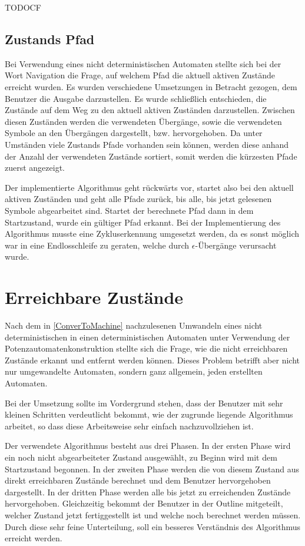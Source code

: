 TODOCF


\subsection{Zustands Pfad}

Bei Verwendung eines nicht deterministischen Automaten stellte sich bei der
Wort Navigation die Frage, auf welchem Pfad die aktuell aktiven Zustände
erreicht wurden. Es wurden verschiedene Umsetzungen in Betracht gezogen, dem
Benutzer die Ausgabe darzustellen. Es wurde schließlich entschieden, die
Zustände auf dem Weg zu den aktuell aktiven Zuständen darzustellen. Zwischen
diesen Zuständen werden die verwendeten Übergänge, sowie die verwendeten
Symbole an den Übergängen dargestellt, bzw. hervorgehoben. Da unter Umständen
viele Zustands Pfade vorhanden sein können, werden diese anhand der Anzahl der
verwendeten Zustände sortiert, somit werden die kürzesten Pfade zuerst
angezeigt.\vspace{10pt}

Der implementierte Algorithmus geht rückwärts vor, startet also bei den aktuell
aktiven Zuständen und geht alle Pfade zurück, bis alle, bis jetzt gelesenen
Symbole abgearbeitet sind. Startet der berechnete Pfad dann in dem
Startzustand, wurde ein gültiger Pfad erkannt. Bei der Implementierung des
Algorithmus musste eine Zykluserkennung umgesetzt werden, da es sonst möglich
war in eine Endlosschleife zu geraten, welche durch $\epsilon$-Übergänge
verursacht wurde.


\section{Erreichbare Zustände}\label{ReachableStates}

Nach dem in \ref{ConverToMachine} nachzulesenen Umwandeln eines nicht
deterministischen in einen deterministischen Automaten unter Verwendung der
Potenzautomatenkonstruktion stellte sich die Frage, wie die nicht erreichbaren
Zustände erkannt und entfernt werden können. Dieses Problem betrifft aber nicht
nur umgewandelte Automaten, sondern ganz allgemein, jeden erstellten
Automaten.\vspace{10pt}

Bei der Umsetzung sollte im Vordergrund stehen, dass der Benutzer mit sehr
kleinen Schritten verdeutlicht bekommt, wie der zugrunde liegende Algorithmus
arbeitet, so dass diese Arbeitsweise sehr einfach nachzuvollziehen
ist.\vspace{10pt}

Der verwendete Algorithmus besteht aus drei Phasen. In der ersten Phase wird ein
noch nicht abgearbeiteter Zustand ausgewählt, zu Beginn wird mit dem Startzustand
begonnen. In der zweiten Phase werden die von diesem Zustand aus direkt
erreichbaren Zustände berechnet und dem Benutzer hervorgehoben dargestellt. In
der dritten Phase werden alle bis jetzt zu erreichenden Zustände hervorgehoben.
Gleichzeitig bekommt der Benutzer in der Outline mitgeteilt, welcher Zustand
jetzt fertiggestellt ist und welche noch berechnet werden müssen. Durch diese
sehr feine Unterteilung, soll ein besseres Verständnis des Algorithmus erreicht
werden.
